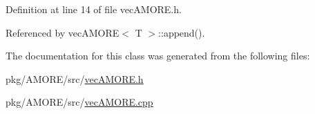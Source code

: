 Definition at line 14 of file vecAMORE.h.



Referenced by vecAMORE$<$ T $>$::append().



The documentation for this class was generated from the following files:\begin{DoxyCompactItemize}
\item 
pkg/AMORE/src/\hyperlink{vec_a_m_o_r_e_8h}{vecAMORE.h}\item 
pkg/AMORE/src/\hyperlink{vec_a_m_o_r_e_8cpp}{vecAMORE.cpp}\end{DoxyCompactItemize}
